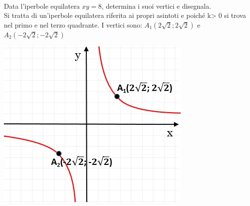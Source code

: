 \begin{esempio}
~

  \begin{minipage}[c]{.6\textwidth}
    Data l'iperbole equilatera $xy=8$, determina i suoi vertici 
e disegnala.\\ Si tratta di un'iperbole equilatera riferita ai propri 
asintoti e poiché k> 0 si trova nel primo e nel terzo quadrante. I vertici 
sono: $ A_{1} \left(2\sqrt{2}; 2\sqrt{2}\right)$ e $ A_{2} 
\left(-2\sqrt{2}; -2\sqrt{2}\right)$
  \end{minipage}
  \hspace{.2cm}
  \begin{minipage}[c]{.35\textwidth}
    \includegraphics[width=\textwidth]{img/equilatera2a.jpg}
  \end{minipage}
\end{esempio}

